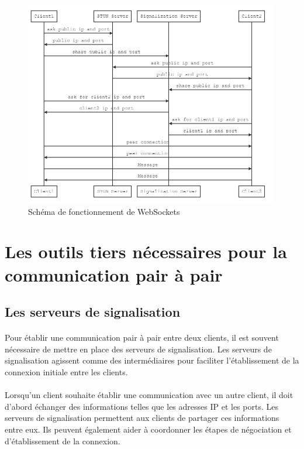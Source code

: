 \newpage
\begin{figure}[ht]
    \centering
    \includegraphics[width=0.99\textwidth]{assets/socket_connection.png}
    \caption{Schéma de fonctionnement de WebSockets}
    \label{fig:websockets}
\end{figure}


\vspace{4cm}

\section{Les outils tiers nécessaires pour la communication pair à pair}
\subsection{Les serveurs de signalisation}

\paragraph{}
Pour établir une communication pair à pair entre deux clients, il est souvent nécessaire de mettre en place des serveurs de signalisation. Les serveurs de signalisation agissent comme des intermédiaires pour faciliter 
l'établissement de la connexion initiale entre les clients.

\paragraph{}
Lorsqu'un client souhaite établir une communication avec un autre client, il doit d'abord échanger des informations telles que les adresses IP et les ports. Les serveurs de signalisation permettent aux clients de partager ces 
informations entre eux. Ils peuvent également aider à coordonner les étapes de négociation et d'établissement de la connexion.

